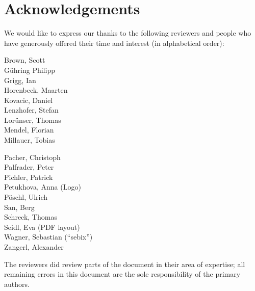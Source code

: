 \newpage
\section{Acknowledgements}
\label{section:Reviewers}



We would like to express our thanks to the following reviewers and people who have generously offered their time and interest (in alphabetical order):


\vline{}

\begin{minipage}[b]{0.5\linewidth}
\center
Brown, Scott \\
G\"uhring Philipp  \\
Grigg, Ian  \\
Horenbeck, Maarten \\
Kovacic, Daniel \\
Lenzhofer, Stefan \\
Lor\"unser, Thomas \\
Mendel, Florian \\
Millauer, Tobias \\
\end{minipage}
\begin{minipage}[b]{0.5\linewidth}
\center
Pacher, Christoph \\
Palfrader, Peter \\
Pichler, Patrick \\
Petukhova, Anna (Logo) \\
P\"oschl, Ulrich \\
San, Berg \\
Schreck, Thomas  \\
Seidl, Eva (PDF layout) \\
Wagner, Sebastian (``sebix'') \\
Zangerl, Alexander \\
\end{minipage}

\vline{}

The reviewers did review parts of the document in their area of
expertise; all remaining errors in this document are the sole
responsibility of the primary authors.



